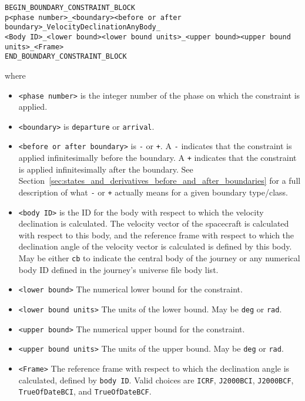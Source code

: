 \documentclass[11pt]{article}
\begin{document}
\begin{verbatim}
BEGIN_BOUNDARY_CONSTRAINT_BLOCK
p<phase number>_<boundary><before or after boundary>_VelocityDeclinationAnyBody_
<Body ID>_<lower bound><lower bound units>_<upper bound><upper bound units>_<Frame>
END_BOUNDARY_CONSTRAINT_BLOCK
\end{verbatim}

where

\begin{itemize}
	\item \texttt{<phase number>} is the integer number of the phase on which the constraint is applied.
	\item \texttt{<boundary>} is \texttt{departure} or \texttt{arrival}.
	\item \texttt{<before or after boundary>} is \texttt{-} or \texttt{+}. A \texttt{-} indicates that the constraint is applied infinitesimally before the boundary. A \texttt{+} indicates that the constraint is applied infinitesimally after the boundary. See Section~\ref{sec:states_and_derivatives_before_and_after_boundaries} for a full description of what \texttt{-} or \texttt{+} actually means for a given boundary type/class.
	\item \texttt{<body ID>} is the ID for the body with respect to which the velocity declination is calculated. The velocity vector of the spacecraft is calculated with respect to this body, and the reference frame with respect to which the declination angle of the velocity vector is calculated is defined by this body. May be either \texttt{cb} to indicate the central body of the journey or any numerical body ID defined in the journey's universe file body list.
	\item \texttt{<lower bound>} The numerical lower bound for the constraint.
	\item \texttt{<lower bound units>} The units of the lower bound. May be \texttt{deg} or \texttt{rad}.
	\item \texttt{<upper bound>} The numerical upper bound for the constraint.
	\item \texttt{<upper bound units>} The units of the upper bound. May be \texttt{deg} or \texttt{rad}.
	\item \texttt{<Frame>} The reference frame with respect to which the declination angle is calculated, defined by \texttt{body ID}. Valid choices are \texttt{ICRF}, \texttt{J2000BCI}, \texttt{J2000BCF}, \texttt{TrueOfDateBCI}, and \texttt{TrueOfDateBCF}.
\end{itemize}
\end{document}
